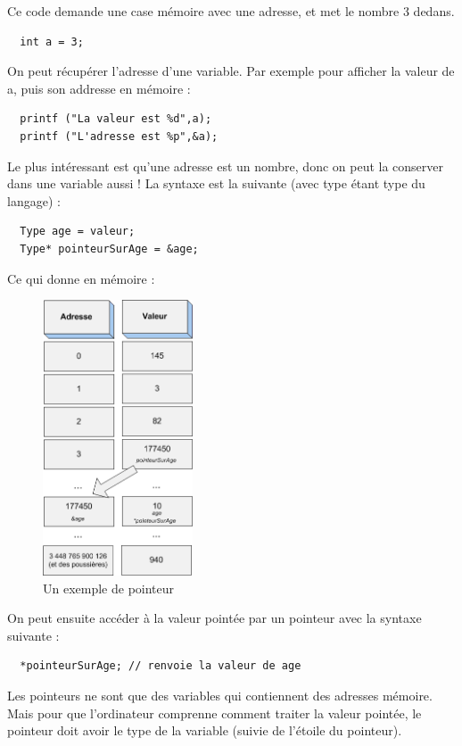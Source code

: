 Ce code demande une case mémoire avec une adresse, et met le nombre 3 dedans.

\begin{lstlisting}
  int a = 3;
\end{lstlisting}

On peut récupérer l'adresse d'une variable. Par exemple pour afficher la valeur de a, puis son addresse en mémoire : 

\begin{lstlisting}
  printf ("La valeur est %d",a);
  printf ("L'adresse est %p",&a);
\end{lstlisting}

Le plus intéressant est qu'une adresse est un nombre, donc on peut la conserver dans une variable aussi !
La syntaxe est la suivante (avec type étant type du langage) : 

\begin{lstlisting}
  Type age = valeur;
  Type* pointeurSurAge = &age;
\end{lstlisting}

Ce qui donne en mémoire : 

\begin{figure}[H]
	\begin{center}
	  \includegraphics[width=12em]{Annexes/Images/pointeurs.png}
	\end{center}
	\caption{Un exemple de pointeur}
\end{figure}

On peut ensuite accéder à la valeur pointée par un pointeur avec la syntaxe suivante : 
\begin{lstlisting}
  *pointeurSurAge; // renvoie la valeur de age
\end{lstlisting}

Les pointeurs ne sont que des variables qui contiennent des adresses mémoire. Mais pour que l'ordinateur comprenne comment traiter la valeur pointée, le pointeur doit 
avoir le type de la variable (suivie de l'étoile du pointeur).


